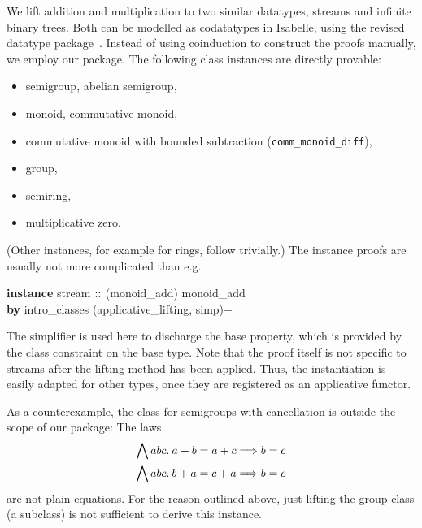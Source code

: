 We lift addition and multiplication to two similar datatypes, streams and
infinite binary trees.
Both can be modelled as codatatypes in Isabelle, using the revised datatype
package~\cite{blanchette14}.
Instead of using coinduction to construct the proofs manually, we employ
our package.
The following class instances are directly provable:
\begin{itemize}
\item semigroup, abelian semigroup,
\item monoid, commutative monoid,
\item commutative monoid with bounded subtraction (\texttt{comm\_monoid\_diff}),
\item group,
\item semiring,
\item multiplicative zero.
\end{itemize}
(Other instances, for example for rings, follow trivially.)
The instance proofs are usually not more complicated than e.g.
\begin{isabelle}
\textbf{instance} stream $\mathrel{::}$ (monoid\_add) monoid\_add \\
\textbf{by} intro\_classes (applicative\_lifting, simp)+
\end{isabelle}
The simplifier is used here to discharge the base property, which is provided
by the class constraint on the base type.
Note that the proof itself is not specific to streams after the lifting
method has been applied.
Thus, the instantiation is easily adapted for other types, once they are
registered as an applicative functor.

As a counterexample, the class for semigroups with cancellation is outside the
scope of our package: The laws
\begin{align*}
\bigwedge a b c.\>a + b &= a + c \Longrightarrow b = c \\
\bigwedge a b c.\>b + a &= c + a \Longrightarrow b = c
\end{align*}
are not plain equations.
For the reason outlined above, just lifting the group class (a subclass) is not
sufficient to derive this instance.

